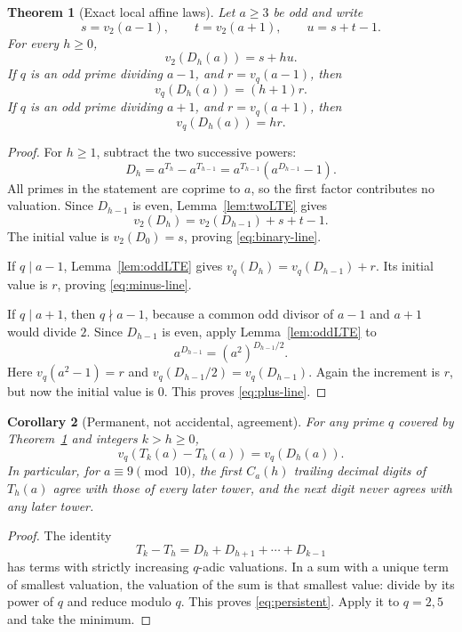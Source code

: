 \documentclass[11pt,letterpaper]{article}
\numberwithin{equation}{section}
\newtheorem{theorem}{Theorem}[section]
\newtheorem{corollary}[theorem]{Corollary}
\theoremstyle{definition}
\theoremstyle{remark}
\begin{document}
\begin{theorem}[Exact local affine laws]\label{thm:local}
Let $a\ge3$ be odd and write
\begin{equation}\label{eq:stu}
 s=v_2(a-1),\qquad t=v_2(a+1),\qquad u=s+t-1.
\end{equation}
For every $h\ge0$,
\begin{equation}\label{eq:binary-line}
 v_2(D_h(a))=s+hu.
\end{equation}
If $q$ is an odd prime dividing $a-1$, and $r=v_q(a-1)$, then
\begin{equation}\label{eq:minus-line}
 v_q(D_h(a))=(h+1)r.
\end{equation}
If $q$ is an odd prime dividing $a+1$, and $r=v_q(a+1)$, then
\begin{equation}\label{eq:plus-line}
 v_q(D_h(a))=hr.
\end{equation}
\end{theorem}
\begin{proof}
For $h\ge1$, subtract the two successive powers:
\begin{equation}\label{eq:Drec}
 D_h=a^{T_h}-a^{T_{h-1}}
     =a^{T_{h-1}}(a^{D_{h-1}}-1).
\end{equation}
All primes in the statement are coprime to $a$, so the first factor contributes no valuation. Since $D_{h-1}$ is even, Lemma~\ref{lem:twoLTE} gives
\[
 v_2(D_h)=v_2(D_{h-1})+s+t-1.
\]
The initial value is $v_2(D_0)=s$, proving \eqref{eq:binary-line}.

If $q\mid a-1$, Lemma~\ref{lem:oddLTE} gives
$v_q(D_h)=v_q(D_{h-1})+r$. Its initial value is $r$, proving \eqref{eq:minus-line}.

If $q\mid a+1$, then $q\nmid a-1$, because a common odd divisor of $a-1$ and $a+1$ would divide $2$. Since $D_{h-1}$ is even, apply Lemma~\ref{lem:oddLTE} to
\[
 a^{D_{h-1}}=(a^2)^{D_{h-1}/2}.
\]
Here $v_q(a^2-1)=r$ and $v_q(D_{h-1}/2)=v_q(D_{h-1})$. Again the increment is $r$, but now the initial value is $0$. This proves \eqref{eq:plus-line}.
\end{proof}

\begin{corollary}[Permanent, not accidental, agreement]\label{cor:persistence}
For any prime $q$ covered by Theorem~\ref{thm:local} and integers $k>h\ge0$,
\begin{equation}\label{eq:persistent}
 v_q(T_k(a)-T_h(a))=v_q(D_h(a)).
\end{equation}
In particular, for $a\equiv9\pmod{10}$, the first $C_a(h)$ trailing decimal digits of $T_h(a)$ agree with those of every later tower, and the next digit never agrees with any later tower.
\end{corollary}
\begin{proof}
The identity
\[
 T_k-T_h=D_h+D_{h+1}+\cdots+D_{k-1}
\]
has terms with strictly increasing $q$-adic valuations. In a sum with a unique term of smallest valuation, the valuation of the sum is that smallest value: divide by its power of $q$ and reduce modulo $q$. This proves \eqref{eq:persistent}. Apply it to $q=2,5$ and take the minimum.
\end{proof}
\end{document}
